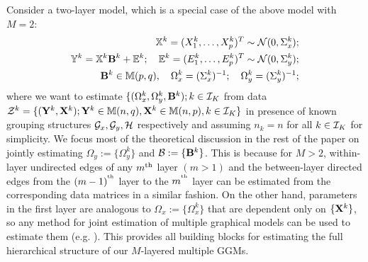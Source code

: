 Consider a two-layer model, which is a special case of the above model with $M=2$:
%
\begin{eqnarray}
{\mathbb{X}}^k = (X^k_1, \ldots, X^k_p)^T \sim {\cal{N}} (0, \Sigma^k_x);\\
{\mathbb{Y}}^k = {\mathbb{X}}^k {\mathbf{B}}^k + {\mathbb{E}}^k; \quad {\mathbb{E}}^k = (E^k_1, \ldots, E^k_p)^T \sim {\cal{N}} (0, \Sigma^k_y);\\
{\mathbf{B}}^k \in {\mathbb{M}}(p,q), \quad \Omega^k_x = (\Sigma^k_x)^{-1}; \quad \Omega^k_y = (\Sigma^k_y)^{-1};
\end{eqnarray}
%
where we want to estimate $\{ (\Omega^k_x, \Omega^k_y, {\mathbf{B}}^k); k \in {\cal{I}}_K$ from data ${\cal{Z}}^k = \{ ({\mathbf{Y}}^k, {\mathbf{X}}^k); {\mathbf{Y}}^k \in {\mathbb{M}}(n,q), {\mathbf{X}}^k \in {\mathbb{M}}(n,p), k \in {\cal{I}}_K\}$ in presence of known grouping structures ${\cal{G}}_x, {\cal{G}}_y, {\cal{H}}$ respectively and assuming $n_k = n$ for all $k \in {\cal{I}}_K$ for simplicity. We focus most of the theoretical discussion in the rest of the paper on jointly estimating $\Omega_y:= \{ \Omega_y^k \}$ and ${\cal{B}} := \{ {\mathbf{B}}^k \}$. This is because for $M>2$, within-layer undirected edges of any $m{\operatorname*{^{\text{th}}}}$ layer $(m>1)$ and the between-layer directed edges from the $(m-1)^{\operatorname*{^{\text{th}}}}$ layer to the $m^{\operatorname*{^{\text{th}}}}$ layer can be estimated from the corresponding data matrices in a similar fashion. On the other hand, parameters in the first layer are analogous to $\Omega_x := \{ \Omega_x^k \}$ that are dependent only on $\{ {\mathbf{X}}^k\}$, so any method for joint estimation of multiple graphical models can be used to estimate them (e.g. \cite{GuoEtal11, MaMichailidis15}). This provides all building blocks for estimating the full hierarchical structure of our $M$-layered multiple GGMs.


